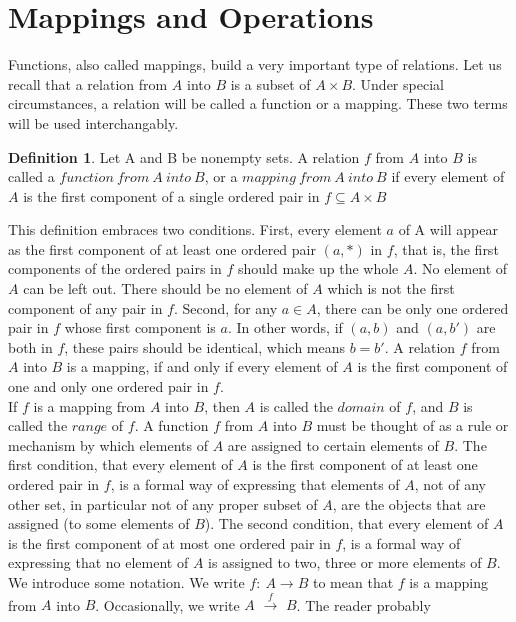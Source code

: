 \documentclass{article}
\begin{document}

\section{Mappings and Operations}
    Functions, also called mappings, build a very important type of relations. Let us recall that a relation from $A$ into $B$ is a subset of $A\times B$. Under special circumstances, a relation will be called a function or a mapping. These two terms will be used interchangably.
    
    \theoremstyle{definition}
    \newtheorem{definition}{Definition}[section]
    \begin{definition}
    Let A and B be nonempty sets. A relation $f$ from $A$ into $B$ is called a $function\ from\ A\ into\ B$, or a $mapping \ from\  A\ into\ B$ if every element of $A$ is the first component of a single ordered pair in $f \subseteq A\times B$   
    \end{definition}
    
    This definition embraces two conditions. First, every element $a$ of A will appear as the first component of at least one ordered pair $(a,*)$ in $f$, that is, the first components of the ordered pairs in $f$ should make up the whole $A$. No element of $A$ can be left out. There should be no element of $A$ which is not the first component of any pair in $f$. Second, for any $a\in A$, there can be only one ordered pair in $f$ whose first component is $a$. In other words, if $(a,b)$  and $(a,b')$ are both in $f$, these pairs should be identical, which means $b=b'$. A relation $f$ from $A$ into $B$ is a mapping, if and only if every element of $A$ is the first component of one and only one ordered pair in $f$.\\
    
    
    If $f$ is a mapping from $A$ into $B$, then $A$ is called the $domain$ of $f$, and $B$ is called the $range$ of $f$. A function $f$ from $A$ into $B$ must be thought of as a rule or mechanism by which elements of $A$ are assigned to certain elements of $B$. The first condition, that every element of $A$ is the first component of at least one ordered pair in $f$, is a formal way of expressing that elements of $A$, not of any other set, in particular not of any proper subset of $A$, are the objects that are assigned (to some elements of $B$). The second condition, that every element of $A$ is the first component of at most one ordered pair in $f$, is a formal way of expressing that no element of $A$ is assigned to two, three or more elements of $B$.\\
    
    
    We introduce some notation. We write $f:\ A\rightarrow B$ to mean that $f$ is a mapping from $A$ into $B$. Occasionally, we write $A$  $\xrightarrow[]{f}$ $B$. The reader probably
    
    
    
\end{document}
